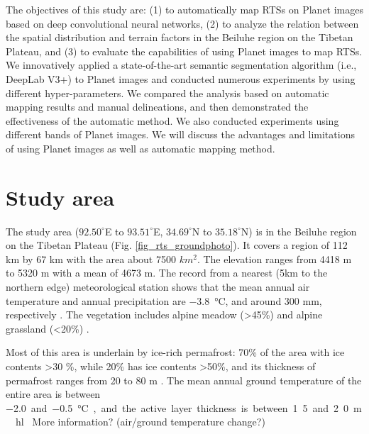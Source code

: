 \documentclass[preprint,12pt,authoryear]{elsarticle}
\begin{document}
The objectives of this study are: (1) to automatically map RTSs on Planet images based on deep convolutional neural networks, (2) to analyze the relation between the spatial distribution and terrain factors in the Beiluhe region on the Tibetan Plateau, and (3) to evaluate the capabilities of using Planet images to map RTSs. We innovatively applied a state-of-the-art semantic segmentation algorithm (i.e., DeepLab V3+) to Planet images and conducted numerous experiments by using different hyper-parameters. We compared the analysis based on automatic mapping results and manual delineations, and then demonstrated the effectiveness of the automatic method. We also conducted experiments using different bands of Planet images. We will discuss the advantages and limitations of using Planet images as well as automatic mapping method. 

\section{Study area}
\label{sec_studyarea}
The study area ($92.50^\circ$E to $93.51^\circ$E, $34.69^\circ$N to $35.18^\circ$N) is in the Beiluhe region on the Tibetan Plateau (Fig. \ref{fig_rts_groundphoto}). It covers a region of 112 km by 67 km with the area about 7500 $km^2$. The elevation ranges from 4418 m to 5320 m with a mean of 4673 m. The record from a nearest (5km to the northern edge) meteorological station shows that the mean annual air temperature and annual precipitation are \SI{-3.8}{\celsius}, and around 300 mm, respectively \citep{luo_thermokarst_2015}. The vegetation includes alpine meadow (\textgreater 45\%) and alpine grassland (\textless 20\%) \citep{luo_thermokarst_2015}. 

Most of this area is underlain by ice-rich permafrost: 70\% of the area with ice contents \textgreater 30 \%, while 20\% has ice contents \textgreater 50\%, and its thickness of permafrost ranges from 20 to 80 m \citep{zhou_geocryology_2000, luo_thermokarst_2015}. The mean annual ground temperature of the entire area is between \SI{-2.0} and \SI{-0.5}{\celsius}, and the active layer thickness is between 1.5 and 2.0 m \citep{zhou_geocryology_2000, luo_thermokarst_2015, wu2010changes, wu2015changes}. \hl{ More information? (air/ground temperature change?)} 
\end{document}
